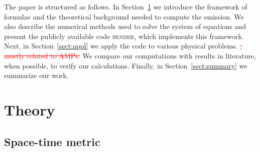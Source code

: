 \documentclass{aa}
\newcommand{\refedel}[1]{\textcolor{red}{\sout{#1}}}
\begin{document}
The paper is structured as follows.
In Section~\ref{sect:theory} we introduce the framework of formulae and the theoretical background needed to compute the emission.
We also describe the numerical methods used to solve the system of equations and present the publicly available code \textsc{bender},%
which implements this framework.
Next, in Section~\ref{sect:appl} we apply the code to various physical problems. \refedel{, mostly related to AMPs.}
We compare our computations with results in literature, when possible, to verify our calculations.
Finally, in Section~\ref{sect:summary} we summarize our work.




\section{Theory}\label{sect:theory}
\subsection{Space-time metric}\label{sect:spacetime}
\end{document}

